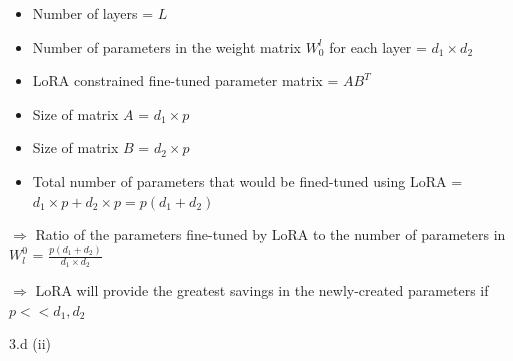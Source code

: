 \begin{answer}
    \begin{itemize}
    \item Number of layers = $L$
    \item Number of parameters in the weight matrix $W_0^l$ for each layer = $d_1 \times d_2$
    \item LoRA constrained fine-tuned parameter matrix = $AB^T$
    \item Size of matrix $A$ = $d_1 \times p$
    \item Size of matrix $B$ = $d_2 \times p$
    \item Total number of parameters that would be fined-tuned using LoRA = $d_1 \times p + d_2 \times p = p(d_1+d_2)$
    \end{itemize}

    $\Rightarrow$ Ratio of the parameters fine-tuned by LoRA to the number of parameters in $W^0_l$ = $ \frac{p(d_1+d_2)}{d_1 \times d_2}$
    
    $\Rightarrow$ LoRA will provide the greatest savings in the newly-created parameters if $p << d_1, d_2$ 
    
\end{answer}

\LARGE
3.d (ii)
\normalsize

